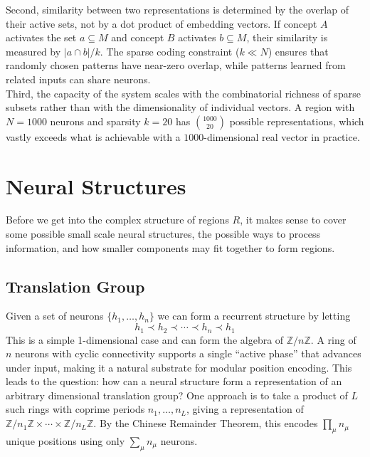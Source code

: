 \documentclass[11pt]{article}
\begin{document}
Second, similarity between two representations is determined by the overlap of their active sets, not by a dot product of embedding vectors. If concept $A$ activates the set $a \subseteq M$ and concept $B$ activates $b \subseteq M$, their similarity is measured by $|a \cap b| / k$. The sparse coding constraint ($k \ll N$) ensures that randomly chosen patterns have near-zero overlap, while patterns learned from related inputs can share neurons.\\

Third, the capacity of the system scales with the combinatorial richness of sparse subsets rather than with the dimensionality of individual vectors. A region with $N = 1000$ neurons and sparsity $k = 20$ has $\binom{1000}{20}$ possible representations, which vastly exceeds what is achievable with a $1000$-dimensional real vector in practice.


\section{Neural Structures}
Before we get into the complex structure of regions $R$, it makes sense to cover some possible small scale neural structures, the possible ways to process information, and how smaller components may fit together to form regions.

\subsection{Translation Group}\label{subsec:rec}
Given a set of neurons $\{h_1, \ldots, h_n\}$ we can form a recurrent structure by letting
\begin{equation}
    h_1 \prec h_2 \prec \cdots \prec h_n \prec h_1
\end{equation}
This is a simple 1-dimensional case and can form the algebra of $\mathbb{Z}/n\mathbb{Z}$. A ring of $n$ neurons with cyclic connectivity supports a single ``active phase'' that advances under input, making it a natural substrate for modular position encoding. This leads to the question: how can a neural structure form a representation of an arbitrary dimensional translation group? One approach is to take a product of $L$ such rings with coprime periods $n_1, \ldots, n_L$, giving a representation of $\mathbb{Z}/n_1\mathbb{Z} \times \cdots \times \mathbb{Z}/n_L\mathbb{Z}$. By the Chinese Remainder Theorem, this encodes $\prod_\mu n_\mu$ unique positions using only $\sum_\mu n_\mu$ neurons.
\end{document}
